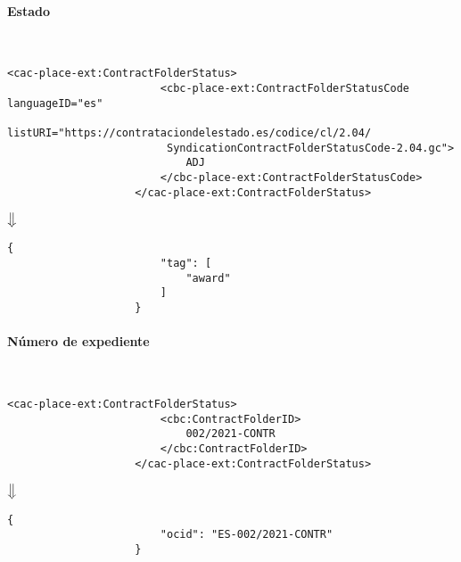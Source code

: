             \paragraph{Estado} \mbox{}\\
                \begin{lstlisting}[language=lXML]
                    <cac-place-ext:ContractFolderStatus>
                        <cbc-place-ext:ContractFolderStatusCode languageID="es"
                         listURI="https://contrataciondelestado.es/codice/cl/2.04/
                         SyndicationContractFolderStatusCode-2.04.gc">
                            ADJ
                        </cbc-place-ext:ContractFolderStatusCode>
                    </cac-place-ext:ContractFolderStatus>
                \end{lstlisting}
                
                \begin{center}
                    $\big\Downarrow$
                \end{center}
                
                \begin{lstlisting}[language=lJSON]
                    {
                        "tag": [
                            "award"
                        ]
                    }
                \end{lstlisting}
                
            \paragraph{Número de expediente} \mbox{}\\
                \begin{lstlisting}[language=lXML]
                    <cac-place-ext:ContractFolderStatus>
                        <cbc:ContractFolderID>
                            002/2021-CONTR
                        </cbc:ContractFolderID>
                    </cac-place-ext:ContractFolderStatus>
                \end{lstlisting}
                
                \begin{center}
                    $\big\Downarrow$
                \end{center}
                
                \begin{lstlisting}[language=lJSON]
                    {
                        "ocid": "ES-002/2021-CONTR"
                    }
                \end{lstlisting}
                
